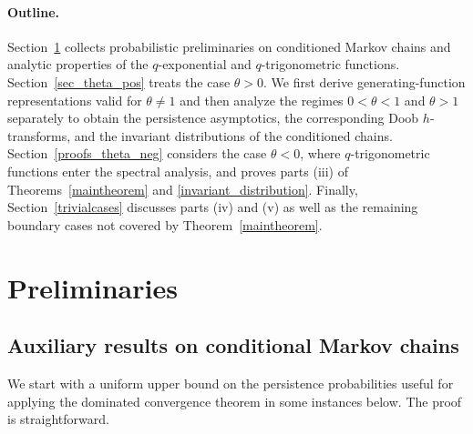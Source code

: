 \documentclass[10pt,a4paper]{amsart}
\newcommand{\1}{\mathds{1}}
\begin{document}
\paragraph{Outline.} Section~\ref{sec_preliminaries} collects probabilistic preliminaries on conditioned Markov chains and analytic properties of the $q$-exponential and $q$-trigonometric functions. Section~\ref{sec_theta_pos} treats the case $\theta>0$. We first derive generating-function representations valid for $\theta\ne1$ and then analyze the regimes $0<\theta<1$ and $\theta>1$ separately to obtain the persistence asymptotics, the corresponding Doob $h$-transforms, and the invariant distributions of the conditioned chains. Section~\ref{proofs_theta_neg} considers the case $\theta<0$, where $q$-trigonometric functions enter the spectral analysis, and proves parts (iii) of Theorems~\ref{maintheorem} and \ref{invariant_distribution}. Finally, Section~\ref{trivialcases} discusses parts (iv) and (v) as well as the remaining boundary cases not covered by Theorem~\ref{maintheorem}.

\section{Preliminaries}\label{sec_preliminaries}
\subsection{Auxiliary results on conditional Markov chains}
We start with a uniform upper bound on the persistence probabilities useful for applying the dominated convergence theorem in some instances below. The proof is straightforward. 
\end{document}
